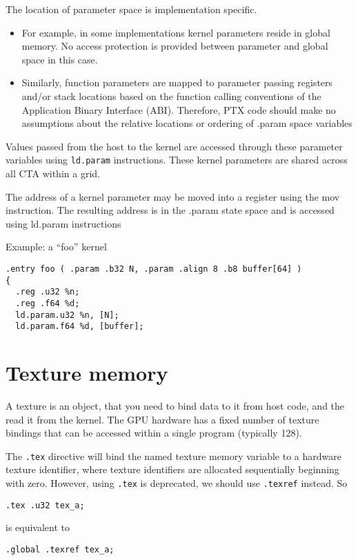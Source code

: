 The location of parameter space is implementation specific.
\begin{itemize}
\item For example, in some implementations kernel parameters reside in
  global memory. No access protection is provided between parameter
  and global space in this case.
\item Similarly, function parameters are mapped to parameter passing
  registers and/or stack locations based on the function calling
  conventions of the Application Binary Interface (ABI). Therefore,
  PTX code should make no assumptions about the relative locations or
  ordering of .param space variables
\end{itemize}

Values passed from the host to the kernel are accessed through these
parameter variables using \verb!ld.param! instructions. These kernel
parameters are shared across all CTA within a grid. 


The address of a kernel parameter may be moved into a register using
the mov instruction.  The resulting address is in the .param state
space and is accessed using ld.param instructions

Example: a ``foo'' kernel
\begin{lstlisting}
.entry foo ( .param .b32 N, .param .align 8 .b8 buffer[64] )
{
  .reg .u32 %n;
  .reg .f64 %d;
  ld.param.u32 %n, [N];
  ld.param.f64 %d, [buffer];
\end{lstlisting}


\section{Texture memory}
\label{sec:texture-}

A texture is an object, that you need to bind data to it from host
code, and the read it from the kernel.  The GPU hardware has a fixed
number of texture bindings that can be accessed within a single
program (typically 128).

The \verb!.tex! directive will bind the named texture memory variable
to a hardware texture identifier, where texture identifiers are
allocated sequentially beginning with zero. However, using \verb!.tex!
is deprecated, we should use \verb!.texref! instead. So
\begin{lstlisting}
.tex .u32 tex_a;
\end{lstlisting}
is equivalent to
\begin{lstlisting}
.global .texref tex_a;
\end{lstlisting}

